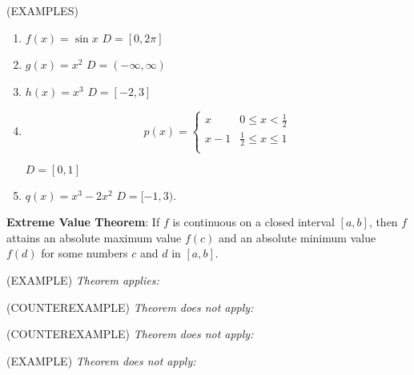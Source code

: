 \documentclass[11pt]{article}
\begin{document}
\pagebreak
(EXAMPLES)
\begin{enumerate}
\item{$f(x) = \sin{x}$ \quad $D = [0,2\pi]$}

\vspace{1.in}

\item{$g(x) = x^2$ \quad $D = (-\infty,\infty)$}

\vspace{1.in}

\item{$h(x) = x^3$ \quad $D = [-2,3]$}

\vspace{1.in}

\item{  \begin{displaymath}
p(x) =   \left\{ \begin{array}{ll}
x & 0\le x <  \frac12 \\
x-1 & \frac12 \le x \le 1\\
\end{array} \right.
  \end{displaymath}

  $D = [0,1]$
}
  \vspace{1.5in}

\item{  $q(x) = x^3-2x^2$  \quad $D=[-1,3)$.}

\end{enumerate}
    \pagebreak

    {\bf Extreme Value Theorem}:  If $f$ is continuous on a closed interval $[a,b]$, then $f$ attains an absolute maximum value
    $f(c)$ and an absolute minimum value $f(d)$ for some numbers $c$ and $d$ in $[a,b]$.

    \vspace{1.5in}
    
    (EXAMPLE) \emph{ Theorem applies:}


    \vspace{1.5in}
    
    (COUNTEREXAMPLE)  \emph{Theorem does not apply:}

    \vspace{1.5in}

    
    (COUNTEREXAMPLE)  \emph{Theorem does not apply:}

    \vspace{1.5in}

    (EXAMPLE)  \emph{Theorem does not apply:}
    \pagebreak
   
\end{document}
